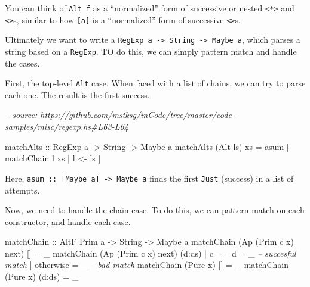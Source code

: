 \documentclass[]{article}
\newenvironment{Shaded}{}{}
\newcommand{\CommentTok}[1]{\textcolor[rgb]{0.38,0.63,0.69}{\textit{#1}}}
\newcommand{\DataTypeTok}[1]{\textcolor[rgb]{0.56,0.13,0.00}{#1}}
\newcommand{\FunctionTok}[1]{\textcolor[rgb]{0.02,0.16,0.49}{#1}}
\newcommand{\NormalTok}[1]{#1}
\newcommand{\OtherTok}[1]{\textcolor[rgb]{0.00,0.44,0.13}{#1}}
\begin{document}
You can think of \texttt{Alt\ f} as a ``normalized'' form of successive or
nested \texttt{\textless{}*\textgreater{}} and
\texttt{\textless{}\textbar{}\textgreater{}}s, similar to how \texttt{{[}a{]}}
is a ``normalized'' form of successive \texttt{\textless{}\textgreater{}}s.

Ultimately we want to write a
\texttt{RegExp\ a\ -\textgreater{}\ String\ -\textgreater{}\ Maybe\ a}, which
parses a string based on a \texttt{RegExp}. TO do this, we can simply pattern
match and handle the cases.

First, the top-level \texttt{Alt} case. When faced with a list of chains, we can
try to parse each one. The result is the first success.

\begin{Shaded}
\begin{Highlighting}[]
\CommentTok{-- source: https://github.com/mstksg/inCode/tree/master/code-samples/misc/regexp.hs#L63-L64}

\OtherTok{matchAlts ::} \DataTypeTok{RegExp}\NormalTok{ a }\OtherTok{->} \DataTypeTok{String} \OtherTok{->} \DataTypeTok{Maybe}\NormalTok{ a}
\NormalTok{matchAlts (}\DataTypeTok{Alt}\NormalTok{ ls) xs }\FunctionTok{=}\NormalTok{ asum [ matchChain l xs }\FunctionTok{|}\NormalTok{ l }\OtherTok{<-}\NormalTok{ ls  ]}
\end{Highlighting}
\end{Shaded}

Here, \texttt{asum\ ::\ {[}Maybe\ a{]}\ -\textgreater{}\ Maybe\ a} finds the
first \texttt{Just} (success) in a list of attempts.

Now, we need to handle the chain case. To do this, we can pattern match on each
constructor, and handle each case.

\begin{Shaded}
\begin{Highlighting}[]
\OtherTok{matchChain ::} \DataTypeTok{AltF} \DataTypeTok{Prim}\NormalTok{ a }\OtherTok{->} \DataTypeTok{String} \OtherTok{->} \DataTypeTok{Maybe}\NormalTok{ a}
\NormalTok{matchChain (}\DataTypeTok{Ap}\NormalTok{ (}\DataTypeTok{Prim}\NormalTok{ c x) next) []     }\FunctionTok{=}\NormalTok{ _}
\NormalTok{matchChain (}\DataTypeTok{Ap}\NormalTok{ (}\DataTypeTok{Prim}\NormalTok{ c x) next) (d}\FunctionTok{:}\NormalTok{ds)}
    \FunctionTok{|}\NormalTok{ c }\FunctionTok{==}\NormalTok{ d    }\FunctionTok{=}\NormalTok{ _             }\CommentTok{-- succesful match}
    \FunctionTok{|} \FunctionTok{otherwise} \FunctionTok{=}\NormalTok{ _             }\CommentTok{-- bad match}
\NormalTok{matchChain (}\DataTypeTok{Pure}\NormalTok{ x)             []     }\FunctionTok{=}\NormalTok{ _}
\NormalTok{matchChain (}\DataTypeTok{Pure}\NormalTok{ x)             (d}\FunctionTok{:}\NormalTok{ds) }\FunctionTok{=}\NormalTok{ _}
\end{Highlighting}
\end{Shaded}
\end{document}

